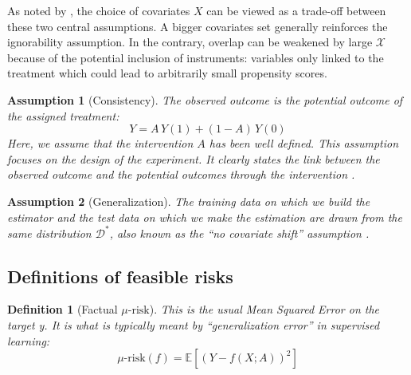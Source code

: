 \documentclass[a4paper,num-refs]{oup-contemporary}%
\newtheorem{definition}{Definition}
\newtheorem{assumption}{Assumption}
\begin{document}
As noted by \cite{damour_overlap_2020}, the choice of covariates $X$ can
be viewed as a trade-off between these two central assumptions. A bigger
covariates set generally reinforces the ignorability assumption. In the
contrary, overlap can be weakened by large $\mathcal{X}$ because of the
potential inclusion of instruments: variables only linked to the treatment which
could lead to arbitrarily small propensity scores.


\begin{assumption}[Consistency]\label{assumption:consistency} The observed
    outcome is the potential outcome of the assigned treatment:
    \begin{equation*}\label{eq:consistancy}
        Y = A \, Y(1) + (1-A) \, Y(0)
    \end{equation*}
    Here, we assume that the intervention $A$ has been well defined. This
    assumption focuses on the design of the experiment. It clearly states the link
    between the observed outcome and the potential outcomes through the
    intervention \cite{hernan_causal_2020}.
\end{assumption}

\begin{assumption}[Generalization]\label{assumption:generalization} The training
    data on which we build the estimator and the test data on which we make the
    estimation are drawn from the same distribution $\mathcal D^*$, also known as
    the ``no covariate shift'' assumption \cite{jesson_identifying_2020}.
\end{assumption}

\subsection{Definitions of feasible risks}\label{def:feasible_risks}


\begin{definition}[Factual $\mu\text{-risk}$]\label{def:mu_risk}
    \cite{shalit_estimating_2017} This is the usual Mean Squared Error on
    the target y. It is what is typically meant by ``generalization error'' in
    supervised learning:
    \begin{equation*}\label{eq:mu_risk}
        \mu\text{-risk}(f)=\mathbb{E}\left[(Y-f(X ; A))^2 \right]
    \end{equation*}
\end{definition}
\end{document}
